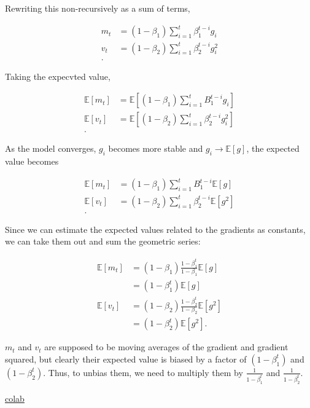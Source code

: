\documentclass[answers]{exam}
\begin{document}
\begin{questions}
\begin{parts}
\begin{solution}
Rewriting this non-recursively as a sum of terms,

\begin{align*}
m_{t} &= (1-\beta_1) \sum_{i=1}^{t}\beta_1^{t-i} g_{i}  \\
v_{t} &= (1-\beta_2) \sum_{i=1}^{t}\beta_2^{t-i} g_{i}^2 \\
.\end{align*}

Taking the expecvted value,

\begin{align*}
\mathbb{E}[m_{t}] &= \mathbb{E}\left[(1-\beta_1) \sum_{i=1}^{t}B_1^{t-i} g_{i}\right] \\
\mathbb{E}[v_{t}] &= \mathbb{E}\left[(1-\beta_2) \sum_{i=1}^{t}\beta_2^{t-i} g_{i}^2\right] \\
.\end{align*}

As the model converges, $g_i$ becomes more stable and $g_i \to \mathbb{E}[g]$, 
the expected value becomes

\begin{align*}
\mathbb{E}[m_{t}] &= (1-\beta_1) \sum_{i=1}^{t}B_1^{t-i} \mathbb{E}[g] \\
\mathbb{E}[v_{t}] &= (1-\beta_2) \sum_{i=1}^{t}\beta_2^{t-i} \mathbb{E}[g^2]\\
.\end{align*}

Since we can estimate the expected values related to the gradients as constants,
we can take them out and sum the geometric series:

\begin{align*}
\mathbb{E}[m_{t}] &= (1-\beta_1) \frac{1-\beta_1^{t}}{1-\beta_1} \mathbb{E}[g] \\
&= (1-\beta_1^{t})\mathbb{E}[g] \\
\mathbb{E}[v_{t}] &= (1-\beta_2) \frac{1-\beta_2^{t}}{1-\beta_2} \mathbb{E}[g^2] \\
&= (1-\beta_2^{t})\mathbb{E}[g^2]
.\end{align*}

$m_{t}$ and $v_{t}$ are supposed to be moving averages of the gradient and
gradient squared, but clearly their expected value is biased by a factor of
$(1-\beta_1^{t})$ and $(1-\beta_2^{t})$. Thus, to unbias them, we need to
multiply them by $\frac{1}{1-\beta_1^{t}}$ and $\frac{1}{1-\beta_2^{t}}$.

\href{https://colab.research.google.com/drive/1tJlZ-QLsr9tMvhipsfVXQ-yYTJ757TNL?usp=sharing}{colab}


\end{solution}
\end{parts}
\end{questions}
\end{document}
